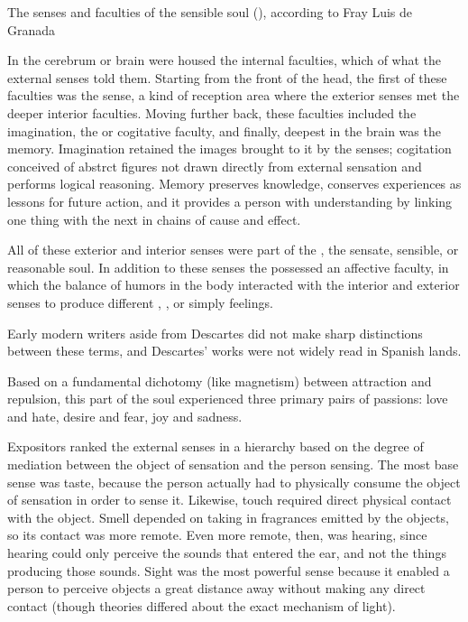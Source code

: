 \begin{table}
\caption{The senses and faculties of the sensible soul (), according to Fray Luis de Granada}
\label{table:senses-fray-luis}
\end{table}

In the cerebrum or brain were housed the internal faculties, which  of what the external senses told them.
Starting from the front of the head, the first of these faculties was the  sense, a kind of reception area where the exterior senses met the deeper interior faculties.
Moving further back, these faculties included the imagination, the  or cogitative faculty, and finally, deepest in the brain was the memory.
Imagination retained the images brought to it by the senses; cogitation conceived of abstrct figures not drawn directly from external sensation and performs logical reasoning.
Memory preserves knowledge, conserves experiences as lessons for future action, and it provides a person with understanding by linking one thing with the next in chains of cause and effect.\XXX{}

All of these exterior and interior senses were part of the , the sensate, sensible, or reasonable soul.
In addition to these senses the  possessed an affective faculty, in which the balance of humors in the body interacted with the interior and exterior senses to produce different , , or simply feelings.
  \begin{Footnote}
  Early modern writers aside from Descartes did not make sharp distinctions between these terms, and Descartes' works were not widely read in Spanish lands.\XXX{}
  \end{Footnote}
Based on a fundamental dichotomy (like magnetism) between attraction and repulsion, this  part of the soul experienced three primary pairs of passions: love and hate, desire and fear, joy and sadness.



Expositors ranked the external senses in a hierarchy based on the degree of mediation between the object of sensation and the person sensing.
The most base sense was taste, because the person actually had to physically consume the object of sensation in order to sense it.
Likewise, touch required direct physical contact with the object.
Smell depended on taking in fragrances emitted by the objects, so its contact was more remote.
Even more remote, then, was hearing, since hearing could only perceive the sounds that entered the ear, and not the things producing those sounds.
Sight was the most powerful sense because it enabled a person to perceive objects a great distance away without making any direct contact (though theories differed about the exact mechanism of light).\citXXX{}

